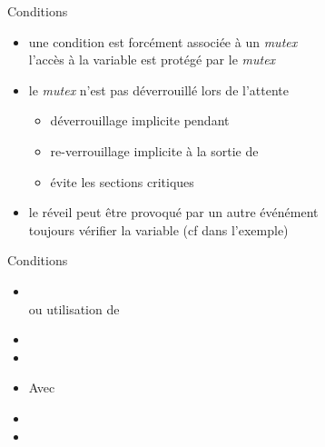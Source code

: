 \begin {frame} {Conditions}
    \begin {itemize}
	\item une condition est forcément associée à un \emph {mutex} \\
	    \implique l'accès à la variable est protégé par le \emph {mutex}

	\item le \emph {mutex} n'est pas déverrouillé lors de l'attente

	    \begin {itemize}
		\item déverrouillage implicite pendant
		\item re-verrouillage implicite à la sortie de
		\item \implique évite les sections critiques

	    \end {itemize}

	\item le réveil peut être provoqué par un autre événément \\
	    \implique toujours vérifier la variable (cf 
	    dans l'exemple)

    \end {itemize}
\end {frame}

\begin {frame} {Conditions}
    \begin {itemize}
	\item {}
	    \\
	    ou utilisation de 
	\item {}
	\item {}
	\item {}

	    Avec 
	\item {}
	\item {}
    \end {itemize}
\end {frame}


